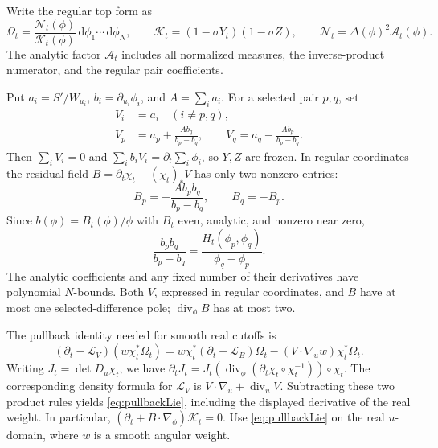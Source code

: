 \documentclass[11pt]{article}
\numberwithin{equation}{section}
\theoremstyle{definition}
\newcommand{\dd}{\,\mathrm d}
\newcommand{\Li}{\mathcal L}
\begin{document}
Write the regular top form as
\[
 \Omega_t=
  \frac{\mathscr N_t(\phi)}{\mathcal K_t(\phi)}
       \dd\phi_1\cdots\dd\phi_N,\qquad
 \mathcal K_t=(1-\sigma Y_t)(1-\sigma Z),\qquad
 \mathscr N_t=\Delta(\phi)^2\mathscr A_t(\phi).
\]
The analytic factor \(\mathscr A_t\) includes all normalized measures,
the inverse-product numerator, and the regular pair coefficients.

Put \(a_i=S'/W_{u_i}\), \(b_i=\partial_{u_i}\phi_i\), and
\(A=\sum_i a_i\). For a selected pair \(p,q\), set
\begin{equation}
 \begin{split}
 V_i&=a_i\quad(i\ne p,q),\\
 V_p&=a_p+\frac{Ab_q}{b_p-b_q},\qquad
 V_q=a_q-\frac{Ab_p}{b_p-b_q}.
 \end{split}\label{eq:twofield}
\end{equation}
Then \(\sum_iV_i=0\) and
\(\sum_i b_iV_i=\partial_t\sum_i\phi_i\), so \(Y,Z\) are frozen.
In regular coordinates the residual field
\(B=\partial_t\chi_t-(\chi_t)_*V\) has only two nonzero entries:
\[
 B_p=-\frac{Ab_pb_q}{b_p-b_q},\qquad B_q=-B_p.
\]
Since \(b(\phi)=B_t(\phi)/\phi\) with \(B_t\) even, analytic, and
nonzero near zero,
\[
 \frac{b_pb_q}{b_p-b_q}
     =\frac{H_t(\phi_p,\phi_q)}{\phi_q-\phi_p}.
\]
The analytic coefficients and any fixed number of their derivatives
have polynomial \(N\)-bounds. Both \(V\), expressed in regular
coordinates, and \(B\) have at most one selected-difference pole;
\(\operatorname{div}_\phi B\) has at most two.

The pullback identity needed for smooth real cutoffs is
\begin{equation}
 (\partial_t-\Li_V)(w\chi_t^*\Omega_t)
  =w\chi_t^*(\partial_t+\Li_B)\Omega_t
       -(V\cdot\nabla_u w)\chi_t^*\Omega_t.
 \label{eq:pullbackLie}
\end{equation}
Writing \(J_t=\det D_u\chi_t\), we have
\(\partial_tJ_t=J_t(\operatorname{div}_\phi
(\partial_t\chi_t\circ\chi_t^{-1}))\circ\chi_t\).
The corresponding density formula for \(\mathcal L_V\) is
\(V\cdot\nabla_u+\operatorname{div}_uV\).
Subtracting these two product rules yields \eqref{eq:pullbackLie},
including the displayed derivative of the real weight. In particular,
\((\partial_t+B\cdot\nabla_\phi)\mathcal K_t=0\).
Use \eqref{eq:pullbackLie} on the real \(u\)-domain, where \(w\)
is a smooth angular weight.
\end{document}
